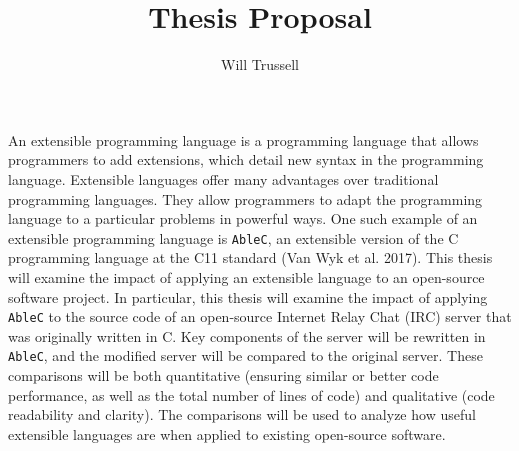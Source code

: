 \documentclass[12pt]{report}
\title{Thesis Proposal} %
\author{Will Trussell}
\begin{document}
\doublespacing

An extensible programming language is a programming language that allows programmers to add extensions, which detail new syntax in the programming language. Extensible languages offer many advantages over traditional programming languages. They allow programmers to adapt the programming language to a particular problems in powerful ways. One such example of an extensible programming language is \verb|AbleC|, an extensible version of the C programming language at the C11 standard (Van Wyk et al. 2017). This thesis will examine the impact of applying an extensible language to an open-source software project. In particular, this thesis will examine the impact of applying \verb|AbleC| to the source code of an open-source Internet Relay Chat (IRC) server that was originally written in C. Key components of the server will be rewritten in \verb|AbleC|, and the modified server will be compared to the original server. These comparisons will be both quantitative (ensuring similar or better code performance, as well as the total number of lines of code) and qualitative (code readability and clarity). The comparisons will be used to analyze how useful extensible languages are when applied to existing open-source software.
\end{document}
